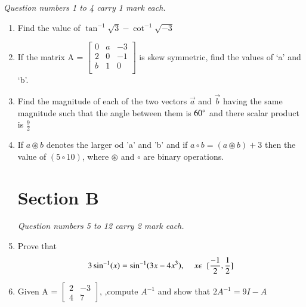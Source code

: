 \documentclass[journal,12pt,twocolumn]{IEEEtran}
\begin{document}
     \begin{flushleft}
      \textit{ Question numbers 1 to 4 carry 1 mark each.}
     \end{flushleft}
    
     
     
     \vspace{4mm}
    
     \begin{enumerate}
     
     \item Find the value of $ \tan^{-1}\sqrt{3} - \cot^{-1}\sqrt{-3} $
     
     \item \noindent If the matrix A = 
     $\begin{bmatrix}
     0 & a & -3 \\
     2 & 0 & -1 \\
     b & 1 & 0 \\
     \end{bmatrix} $
     is skew symmetric, find the values of ‘a’ and      ‘b’.
     
     \item Find the magnitude of each of the two vectors $\vec{a}$ and $\vec{b}$ having the same magnitude such that the angle between them is $60\degree$ and there scalar product is $\frac{9}{2}$
     
     \item If $ a \circledast b $ denotes the larger od 'a' and 'b' and if $ a \circ b = (a \circledast b) + 3 $ then the value of $ (5 \circ 10 ) $, where $\circledast $ and $ \circ $ are binary operations.
     
    \begin{center}
    \section*{Section B}
    \end{center}
    
    \begin{flushleft}
      \textit{ Question numbers 5 to 12 carry 2 mark each.}
     \end{flushleft}
    
    
    \item Prove that 
    $$ 3\sin^{-1}(x) = \sin^{-1}(3x-4x^{3}),\hspace{4mm} x \epsilon \hspace{2mm} [\frac{-1}{2},\frac{1}{2}] $$
    
    \item \noindent Given A = 
 $\begin{bmatrix}
  2 & -3\\ 
  4 & 7
\end{bmatrix}$,  
,compute $A^{-1}$ and show that $2A^{-1} = 9I - A $


\end{enumerate}
\end{document}
